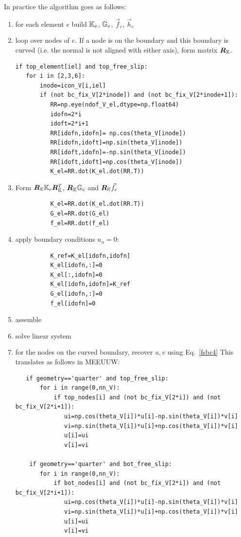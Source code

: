 \noindent In practice the algorithm goes as follows:
\begin{enumerate}
\item for each element $e$ build ${\mathbb{K}}_e$, ${\mathbb{G}}_e$, $\vec{f}_e$, $\vec{h}_e$
\item loop over nodes of $e$. If a node is on the boundary and this boundary is curved (i.e. the normal
is not aligned with either axis), form matrix ${\bm R}_{\mathbb{K}}$.
\begin{lstlisting}
if top_element[iel] and top_free_slip: 
   for i in [2,3,6]:
       inode=icon_V[i,iel] 
       if (not bc_fix_V[2*inode]) and (not bc_fix_V[2*inode+1]): 
          RR=np.eye(ndof_V_el,dtype=np.float64)
          idofn=2*i
          idoft=2*i+1
          RR[idofn,idofn]= np.cos(theta_V[inode]) 
          RR[idofn,idoft]=np.sin(theta_V[inode])
          RR[idoft,idofn]=-np.sin(theta_V[inode]) 
          RR[idoft,idoft]=np.cos(theta_V[inode])
          K_el=RR.dot(K_el.dot(RR.T))
\end{lstlisting}

\item Form ${\bm R}_{\mathbb{K}} {\mathbb{K}}_e {\bm R}_{\mathbb{K}}^T$, ${\bm R}_{\mathbb{K}} {\mathbb{G}}_e$ and ${\bm R}_{\mathbb{K}} \vec{f}_e$
\begin{lstlisting}
          K_el=RR.dot(K_el.dot(RR.T))
          G_el=RR.dot(G_el)
          f_el=RR.dot(f_el)
\end{lstlisting}

\item apply boundary conditions $u_n=0$:
\begin{lstlisting}
          K_ref=K_el[idofn,idofn]
          K_el[idofn,:]=0
          K_el[:,idofn]=0
          K_el[idofn,idofn]=K_ref
          G_el[idofn,:]=0
          f_el[idofn]=0
\end{lstlisting}

\item assemble
\item solve linear system
\item for the nodes on the curved boundary, recover $u,v$ using Eq.~\eqref{fsbc4}
This translates as follows in MEEUUW:
\begin{lstlisting}
   if geometry=='quarter' and top_free_slip:
       for i in range(0,nn_V):
           if top_nodes[i] and (not bc_fix_V[2*i]) and (not bc_fix_V[2*i+1]):
              ui=np.cos(theta_V[i])*u[i]-np.sin(theta_V[i])*v[i]
              vi=np.sin(theta_V[i])*u[i]+np.cos(theta_V[i])*v[i] 
              u[i]=ui
              v[i]=vi
     
    if geometry=='quarter' and bot_free_slip:
       for i in range(0,nn_V):
           if bot_nodes[i] and (not bc_fix_V[2*i]) and (not bc_fix_V[2*i+1]):
              ui=np.cos(theta_V[i])*u[i]-np.sin(theta_V[i])*v[i]
              vi=np.sin(theta_V[i])*u[i]+np.cos(theta_V[i])*v[i] 
              u[i]=ui
              v[i]=vi
\end{lstlisting}

\end{enumerate}

